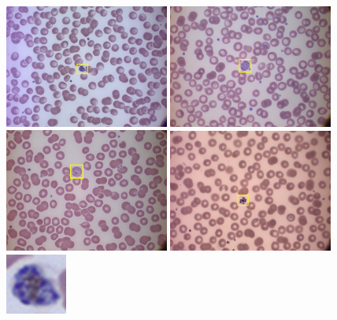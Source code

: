 {	\begin{figure}[!t]
		\centering
		\includegraphics[width=0.48\textwidth]{images/malaria/f2_Pfalciparum_rect}
		\includegraphics[width=0.48\textwidth]{images/malaria/f2_Pvivax_rect}
		\includegraphics[width=0.48\textwidth]{images/malaria/f2_Povale_rect}
		\includegraphics[width=0.48\textwidth]{images/malaria/f2_Pmalariae_rect}
		\includegraphics[width=2cm, height=2cm]{images/malaria/f2_Pfalciparum_crop}

\end{figure}}
